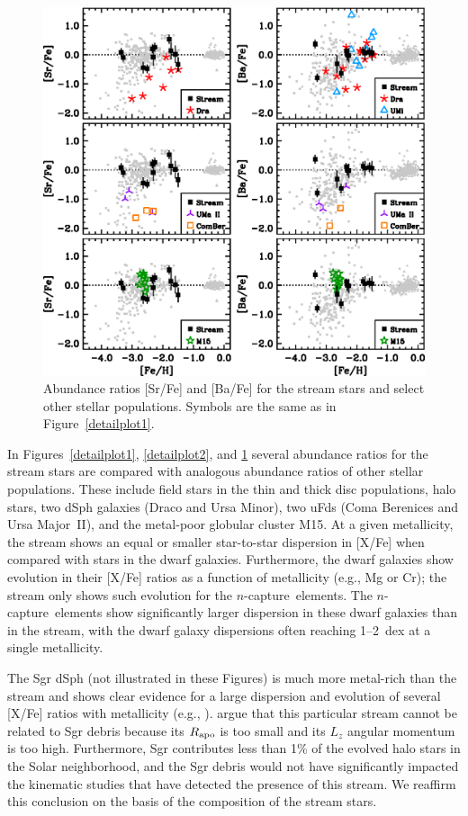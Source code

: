 \documentclass{emulateapj}
\def\ncap{\mbox{$n$-capture}}
\begin{document}
\begin{figure}
\includegraphics[angle=0,width=7.0in]{fig16.eps}
\caption{
\label{detailplot3}
Abundance ratios [Sr/Fe] and [Ba/Fe] for the stream stars and
select other stellar populations.
Symbols are the same as in Figure~\ref{detailplot1}.
}
\end{figure}


In Figures~\ref{detailplot1}, \ref{detailplot2}, and \ref{detailplot3}
several abundance ratios for the stream stars
are compared with analogous abundance ratios of
other stellar populations.
These include field stars in the thin and
thick disc populations, halo stars, two dSph galaxies
(Draco and Ursa Minor),
two uFds (Coma Berenices and Ursa Major~II),
and the metal-poor globular cluster M15.
At a given metallicity, 
the stream shows an equal or smaller star-to-star dispersion in [X/Fe] 
when compared with stars in the dwarf galaxies.
Furthermore, the dwarf galaxies show evolution in their
[X/Fe] ratios as a function of metallicity
(e.g., Mg or Cr);
the stream only shows such evolution for the \ncap\ elements.
The \ncap\ elements show significantly larger dispersion in these
dwarf galaxies than in the stream, with the dwarf galaxy
dispersions often reaching 1--2~dex at a single metallicity.

The Sgr dSph (not illustrated in these Figures) 
is much more metal-rich than the stream and shows clear 
evidence for a large dispersion and evolution 
of several [X/Fe] ratios with metallicity (e.g., 
\citealt{monaco05,monaco07,sbordone07}).
\citet{majewski03} argue that this particular stream cannot be related
to Sgr debris because its $R_{\rm apo}$ is too small and its
$L_{z}$ angular momentum is too high. 
Furthermore, Sgr contributes less than 1\% of the 
evolved halo stars in the Solar neighborhood, and the Sgr debris
would not have significantly impacted the kinematic studies
that have detected the presence of this stream.
We reaffirm this conclusion 
on the basis of the composition of the stream stars.
\end{document}
